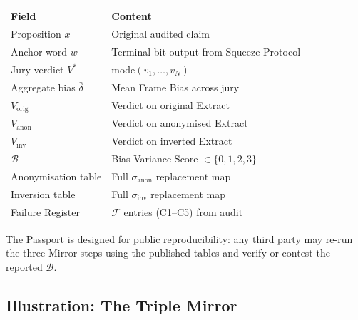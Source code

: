 \documentclass[11pt,a4paper]{article}
\theoremstyle{definition}
\theoremstyle{plain}
\theoremstyle{remark}
\begin{document}
\begin{center}
\begin{tabular}{ll}
\toprule
\textbf{Field} & \textbf{Content} \\
\midrule
Proposition $x$ & Original audited claim \\
Anchor word $w$ & Terminal bit output from Squeeze Protocol \\
Jury verdict $V^*$ & mode$(v_1, \ldots, v_N)$ \\
Aggregate bias $\bar\delta$ & Mean Frame Bias across jury \\
$V_{\mathrm{orig}}$ & Verdict on original Extract \\
$V_{\mathrm{anon}}$ & Verdict on anonymised Extract \\
$V_{\mathrm{inv}}$  & Verdict on inverted Extract \\
$\mathcal{B}$       & Bias Variance Score $\in \{0,1,2,3\}$ \\
Anonymisation table & Full $\sigma_{\mathrm{anon}}$ replacement map \\
Inversion table     & Full $\sigma_{\mathrm{inv}}$ replacement map \\
Failure Register    & $\mathcal{F}$ entries (C1--C5) from audit \\
\bottomrule
\end{tabular}
\end{center}

The Passport is designed for public reproducibility:
any third party may re-run the three Mirror steps
using the published tables and verify or contest
the reported $\mathcal{B}$.

\subsection{Illustration: The Triple Mirror}
\label{apx:triple-mirror-fig}
\end{document}

